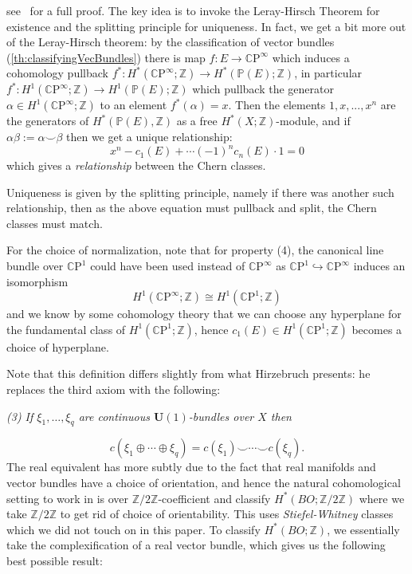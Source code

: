 \documentclass{book}
\newenvironment{Proof}[1][]
  {\begin{ProofTcb}[#1]}
  {\end{ProofTcb}}
\newcommand{\Z}{{\mathbb{Z}}}
\renewcommand{\P}{{\mathbb{P}}}
\newcommand{\CP}{{\mathbb{C}\mathrm{P}}}
\begin{document}
\begin{Proof}
  see~\cite{NateKTheory} for a full proof. The key idea is to invoke the Leray-Hirsch Theorem for existence
  and the splitting principle for uniqueness. In fact, we get a bit more out of the Leray-Hirsch theorem: by the classification of
  vector bundles (\cref{th:classifyingVecBundles}) there is map $f:E \to \CP^\infty$ which induces a
  cohomology pullback $f^*: H^*(\CP^\infty;\Z) \to H^*\left(\P(E);\Z\right)$, in particular $f^*:
  H^1(\CP^\infty;\Z) \to H^1(\P(E); \Z)$ which pullback the generator $\alpha \in H^1(\CP^\infty;\Z)$ to an
  element $f^*(\alpha) = x$. Then the elements $1, x, ..., x^n$ are the generators of $H^*(\P(E), \Z)$ as a
  free $H^*(X; \Z)$-module, and if $\alpha\beta :=\alpha\smile \beta$ then we get a unique relationship:
  \[
    x^n - c_1(E) + \cdots (-1)^n c_n(E)\cdot 1 = 0
  \]
  which gives a \emph{relationship} between the Chern classes.

  Uniqueness is given by the splitting principle, namely if there was another such relationship, then as the
  above equation must pullback and split, the Chern classes must match.
\end{Proof}

For the choice of normalization, note that for property (4), the canonical line bundle over $\CP^1$ could have
been used instead of $\CP^\infty$ as $\CP^1 \hookrightarrow \CP^\infty$ induces an isomorphism
\[
	H^1(\CP^\infty; \Z) \cong H^1(\CP^1;\Z)
\]
and we know by some cohomology theory that we can choose any hyperplane for the fundamental class of
$H^1(\CP^1;\Z)$, hence $c_1(E) \in H^1(\CP^1;\Z)$ becomes a choice of hyperplane.

Note that this definition differs slightly from what Hirzebruch presents: he replaces the third axiom with the
following:
\begin{center}
  \emph{(3) If $\xi_1, \ldots, \xi_q$ are continuous $\mathbf{U}(1)$-bundles over $X$ then}
\end{center}
\[
    c(\xi_1 \oplus \cdots \oplus \xi_q) = c(\xi_1) \smile \cdots \smile c(\xi_q).
\]
The real equivalent has more subtly due to the fact that real manifolds and vector bundles have a choice of
orientation, and hence the natural cohomological setting to work in is over $\Z/2\Z$-coefficient and classify
$H^*(BO; \Z/2\Z)$ where we take $\Z/2\Z$ to get rid of choice of orientability. This uses
\emph{Stiefel-Whitney} classes which we did not touch on in this paper. To classify $H^*(BO; \Z)$, we
essentially take the complexification of a real vector bundle, which gives us the following best possible
result:
\end{document}
